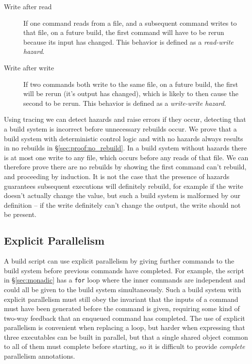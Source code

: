 \begin{description}
\item[Write after read] If one command reads from a file, and a subsequent command writes to that file, on a future build, the first command will have to be rerun because its input has changed. This behavior is defined as a \emph{read-write hazard}.
\item[Write after write] If two commands both write to the same file, on a future build, the first will be rerun (it's output has changed), which is likely to then cause the second to be rerun. This behavior is defined as a \emph{write-write hazard}.
\end{description}

Using tracing we can detect hazards and raise errors if they occur, detecting that a build system is incorrect before unnecessary rebuilds occur. We prove that a build system with deterministic control logic and with no hazards always results in no rebuilds in \S\ref{sec:proof:no_rebuild}. In a build system without hazards there is at most one write to any file, which occurs before any reads of that file. We can therefore prove there are no rebuilds by showing the first command can't rebuild, and proceeding by induction. It is not the case that the presence of hazards guarantees subsequent executions will definitely rebuild, for example if the write doesn't actually change the value, but such a build system is malformed by our definition -- if the write definitely can't change the output, the write should not be present.

\subsection{Explicit Parallelism}
\label{sec:explicit_parallelism}

A build script can use explicit parallelism by giving further commands to the build system before previous commands have completed. For example, the script in \S\ref{sec:monadic} has a \texttt{for} loop where the inner commands are independent and could all be given to the build system simultaneously. Such a build system with explicit parallelism must still obey the invariant that the inputs of a command must have been generated before the command is given, requiring some kind of two-way feedback that an enqueued command has completed. The use of explicit parallelism is convenient when replacing a loop, but harder when expressing that three executables can be built in parallel, but that a single shared object common to all of them must complete before starting, so it is difficult to provide \emph{complete} parallelism annotations.

